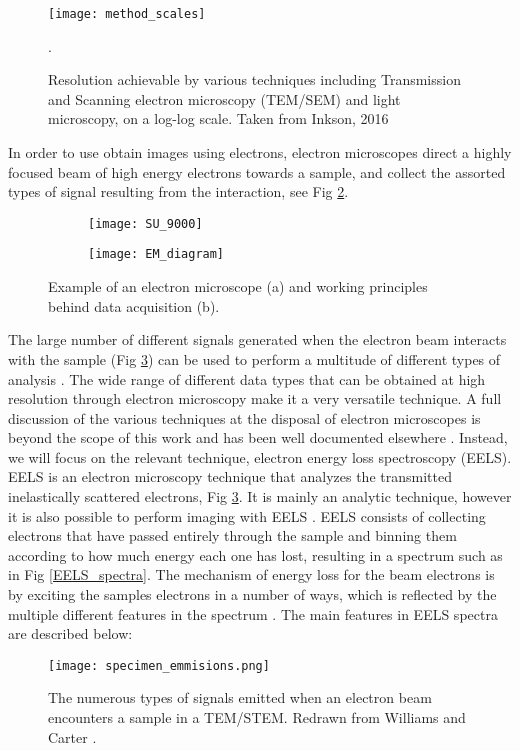 \begin{figure}
	\centering
	\texttt{[image: method\_scales]}
	\caption{Resolution achievable by various techniques including Transmission and Scanning electron microscopy (TEM/SEM) and light microscopy, on a log-log scale.  Taken from Inkson, 2016 \cite{inkson_2_2016}}.
	\label{method_scales}
	
\end{figure}
In order to use obtain images using electrons, electron microscopes direct a highly focused beam of high energy electrons towards a sample, and collect the assorted types of signal resulting from the interaction, see Fig \ref{em_diagram}.


\begin{figure}
\begin{subfigure}{0.45\textwidth}
	\texttt{[image: SU\_9000]}
	\caption{}
\end{subfigure}
\hfill
\begin{subfigure}{0.45\textwidth}
	\texttt{[image: EM\_diagram]}
	\caption{}
\end{subfigure}
	\caption{Example of an electron microscope (a) and working principles behind data acquisition (b). }
	\label{em_diagram}
\end{figure}

The large number of different signals generated when the electron beam interacts with the sample (Fig \ref{specimen_emmisions}) can be used to perform a multitude of different types of analysis \cite{williams_transmission_2008}. The wide range of different data types that can be obtained at high resolution through electron microscopy make it a very versatile technique. A full discussion of the various techniques at the disposal of electron microscopes is beyond the scope of this work and has been well documented elsewhere \cite{goldstein_electron_2003,Egerton,williams_transmission_2008,reimer_electron_1998}.  Instead, we will focus on the relevant technique, electron energy loss spectroscopy (EELS).  EELS is an electron microscopy technique that analyzes the transmitted inelastically scattered electrons, Fig \ref{specimen_emmisions}\cite{Egerton}.  It is mainly an analytic technique, however it is also possible to perform imaging with EELS \cite{varela_stem-eels_2012}.  EELS consists of collecting electrons that have passed entirely through the sample and binning them according to how much energy each one has lost, resulting in a spectrum such as in Fig \ref{EELS_spectra}.  The mechanism of energy loss for the beam electrons is by exciting the samples electrons in a number of ways,  which is reflected by the multiple different features in the spectrum \cite{Egerton}. The main features in EELS spectra are described below: 
\begin{figure}
	\centering
	\texttt{[image: specimen\_emmisions.png]}
	\caption{The numerous types of signals emitted when an electron beam encounters a sample in a TEM/STEM.   Redrawn from Williams and Carter \cite{williams_transmission_2008}.  }
	\label{specimen_emmisions}
\end{figure}

